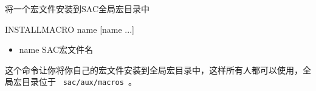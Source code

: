 \label{cmd:installmacro}

将一个宏文件安装到SAC全局宏目录中

\begin{SACSTX}
INSTALLMACRO name [name ...]
\end{SACSTX}

\begin{itemize}
\item name SAC宏文件名
\end{itemize}

这个命令让你将你自己的宏文件安装到全局宏目录中，这样所有人都可以使用，全局宏目录位于
~\lstinline{sac/aux/macros}~。

